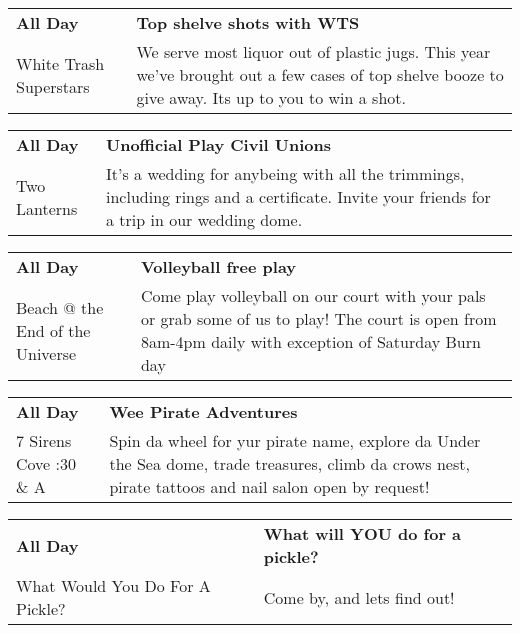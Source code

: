 \begin{tabular}{ p{1in} p{2.2in} }
    \textbf{All Day} & \textbf{Top shelve shots with WTS} \\
    White Trash Superstars \newline  & We serve most liquor out of plastic jugs. This year we've brought out a few cases of top shelve booze to give away. Its up to you to win a shot. \\
    \hline 
\end{tabular}
    
\begin{tabular}{ p{1in} p{2.2in} }
    \textbf{All Day} & \textbf{Unofficial Play Civil Unions} \\
    Two Lanterns \newline  & It's a wedding for anybeing with all the trimmings, including rings and a certificate.  Invite your friends for a trip in our wedding dome. \\
    \hline 
\end{tabular}
    
\begin{tabular}{ p{1in} p{2.2in} }
    \textbf{All Day} & \textbf{Volleyball free play } \\
    Beach @ the End of the Universe \newline  & Come play volleyball on our court with your pals or grab some of us to play! The court is open from 8am-4pm daily with exception of Saturday Burn day \\
    \hline 
\end{tabular}
    
\begin{tabular}{ p{1in} p{2.2in} }
    \textbf{All Day} & \textbf{Wee Pirate Adventures} \\
    7 Sirens Cove \newline 7:30 \& A & Spin da wheel for yur pirate name, explore da Under the Sea dome, trade treasures, climb da crows nest, pirate tattoos and nail salon open by request! \\
    \hline 
\end{tabular}
    
\begin{tabular}{ p{1in} p{2.2in} }
    \textbf{All Day} & \textbf{What will YOU do for a pickle?} \\
    What Would You Do For A Pickle? \newline  & Come by, and lets find out! \\
    \hline 
\end{tabular}
    
